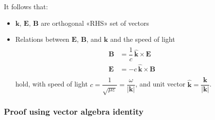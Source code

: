 \documentclass[letterpaper,10pt,italian]{jupyterBook}
\begin{document}
\sphinxAtStartPar
It follows that:
\begin{itemize}
\item {} 
\sphinxAtStartPar
\(\mathbf{k}\), \(\mathbf{E}\), \(\mathbf{B}\) are orthogonal «RHS» set of vectors

\item {} 
\sphinxAtStartPar
Relations between \(\mathbf{E}\), \(\mathbf{B}\), and \(\mathbf{k}\) and the speed of light
\begin{equation*}
\begin{split}\begin{aligned}
      \mathbf{B} & = \dfrac{1}{c} \, \hat{\mathbf{k}} \times \mathbf{E} \\
      \mathbf{E} & = - c \, \hat{\mathbf{k}} \times \mathbf{B} \\
    \end{aligned}\end{split}
\end{equation*}
\sphinxAtStartPar
hold, with speed of light \(c = \dfrac{1}{\sqrt{\mu \varepsilon}} = \dfrac{\omega}{|\mathbf{k}|}\), and unit vector \(\hat{\mathbf{k}} = \dfrac{\mathbf{k}}{|\mathbf{k}|}\).

\end{itemize}
\subsubsection*{Proof using vector algebra identity}
\end{document}
